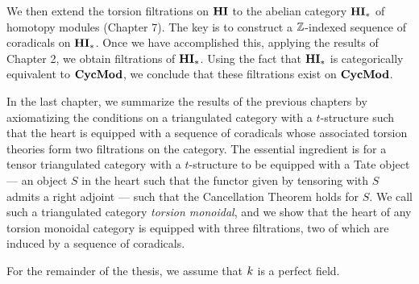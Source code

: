We then extend the torsion
filtrations on $\mathbf{HI}$ to the abelian category $\mathbf{HI}_*$ of homotopy 
modules (Chapter 7). The key is to construct a $\mathbb{Z}$-indexed sequence
of coradicals on $\mathbf{HI}_*$. Once we have accomplished this, applying
the results of Chapter 2, we obtain filtrations of $\mathbf{HI}_*$. Using 
the fact that $\mathbf{HI}_*$ is categorically equivalent to $\mathbf{CycMod}$, we 
conclude that these filtrations exist on $\mathbf{CycMod}$. 

In the last chapter, we summarize the results of the previous 
chapters by axiomatizing the conditions on a triangulated category with a 
$t$-structure such that the heart is equipped with a sequence of 
coradicals whose associated torsion theories form two filtrations 
on the category. The essential ingredient is for a tensor 
triangulated category with a $t$-structure to be equipped with a 
Tate object --- an object $S$ in the heart such that the functor 
given by tensoring with $S$ admits a right adjoint --- such that 
the Cancellation Theorem holds for $S$. We call such a 
triangulated category \emph{torsion monoidal}, and we show that 
the heart of any torsion monoidal category is equipped with three 
filtrations, two of which are induced by a sequence of coradicals.

For the remainder of the thesis, we assume that $k$ is
a perfect field.
